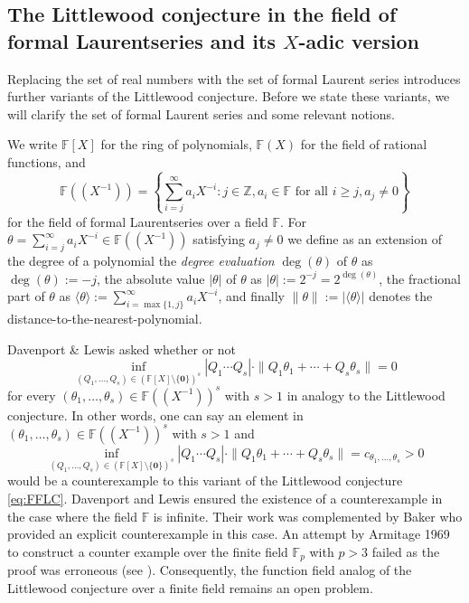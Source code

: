 \documentclass{article}
\newcommand{\ZZ}{\mathbb Z}
\newcommand{\FF}{\mathbb{F}}
\renewcommand{\(}{\left (}
\renewcommand{\)}{\right )}
\theoremstyle{definition}
\numberwithin{equation}{section}
\begin{document}
\subsection{The Littlewood conjecture in the field of formal Laurentseries and its $X$-adic version}\label{subsec:2}

Replacing the set of real numbers with the set of formal Laurent series introduces further variants of the Littlewood conjecture. Before we state these variants, we will clarify the set of formal Laurent series and some relevant notions.

We write $\FF[X]$ for the ring of polynomials, $\FF(X)$ for the field of rational functions, and $$\FF((X^{-1}))=\left\{\sum_{i=j}^\infty a_iX^{-i}:j\in\ZZ, a_i \in\FF \mbox{ for all }i\geq j, a_j\neq 0\right\}$$ for the field of formal Laurentseries over a field $\FF$. 
For $\theta=\sum_{i=j}^\infty a_iX^{-i}\in\FF((X^{-1}))$ satisfying $a_j\neq 0$ we define as an extension of the degree of a polynomial the \emph{degree evaluation} $\deg(\theta)$ of $\theta$ as $\deg(\theta):=-j$,
	 the absolute value $|\theta|$ of $\theta$ as $|\theta|:=2^{-j}=2^{\deg(\theta)}$,
 the fractional part of $\theta$ as $\langle \theta\rangle:= \sum_{i=\max\{1,j\}}^\infty a_iX^{-i}$, and finally $\|\theta\|:=|\langle \theta\rangle|$ denotes the distance-to-the-nearest-polynomial. 

Davenport \& Lewis \cite{DavLew1963} asked whether or not
\begin{equation}\label{eq:FFLC}
\inf_{(Q_1,\ldots,Q_s)\in(\FF[X]\setminus\{\boldsymbol{0}\})^s} |Q_1\cdots Q_s| \cdot\|Q_1\theta_1+\cdots+Q_s\theta_s\|=0
\end{equation}
for every $(\theta_1,\ldots,\theta_s) \in\FF((X^{-1}))^s$ with $s>1$ in analogy to the Littlewood conjecture. 
In other words, one can say an element in $(\theta_1,\ldots,\theta_s) \in\FF((X^{-1}))^s$ with $s>1$ and
$$\inf_{(Q_1,\ldots,Q_s)\in(\FF[X]\setminus\{\boldsymbol{0}\})^s} |Q_1\cdots Q_s| \cdot\|Q_1\theta_1+\cdots+Q_s\theta_s\|=c_{\theta_1,\ldots,\theta_s}>0$$
would be a counterexample to this variant of the Littlewood conjecture \eqref{eq:FFLC}.
Davenport and Lewis \cite{DavLew1963} ensured the existence of a counterexample in the case where the field $\FF$ is infinite. Their work was complemented by Baker \cite{Baker1964} who provided an explicit counterexample in this case. An attempt by Armitage 1969 to construct a counter example over the finite field $\FF_p$ with $p>3$ failed as the proof was erroneous (see \cite{Arm1970}). Consequently, the function field analog of the Littlewood conjecture over a finite field remains an open problem. 
\end{document}

